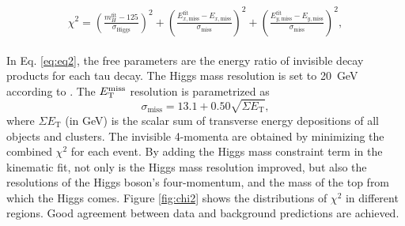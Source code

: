\begin{eqnarray}
\begin{array}{ll}
\chi^2 = 
\left( \frac{m_{H}^{\text{fit}} - 125}{\sigma_{\text{Higgs}}} \right)^2 + \left( \frac{E_{x,\text{miss}}^{\text{fit}} - E_{x,\text{miss}}}{\sigma_{\text{miss}}} \right)^2 + \left( \frac{E_{y,\text{miss}}^{\text{fit}} - E_{y,\text{miss}}}{\sigma_{\text{miss}}} \right)^2 ,
\end{array}
\label{eq:eq2}
\end{eqnarray}

%

In Eq. \ref{eq:eq2}, the free parameters are the energy ratio of invisible decay products for each tau decay.
The Higgs mass resolution is set to 20~GeV according to \cite{Htautau}. The $E_{\text{T}}^{\text{miss}}$ resolution is parametrized as
\begin{equation}
\sigma_{\text{miss}}=13.1 + 0.50\sqrt{\Sigma E_\text{T}},
\label{eq:eq7}
\end{equation}
where $\Sigma E_\text{T}$ (in GeV) is the scalar sum of transverse energy depositions of all objects and clusters. The invisible 4-momenta are obtained by minimizing the combined $\chi^2$ for each event. By adding the Higgs mass constraint term in the kinematic fit, not only is the Higgs mass resolution improved, but also the resolutions of the Higgs boson's four-momentum, and the mass of the top from which the Higgs comes. Figure \ref{fig:chi2} shows the distributions of $\chi^2$ in different regions. Good agreement between data and background predictions are achieved.

